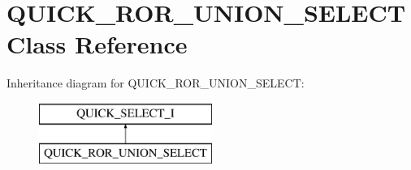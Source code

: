 \hypertarget{classQUICK__ROR__UNION__SELECT}{}\section{Q\+U\+I\+C\+K\+\_\+\+R\+O\+R\+\_\+\+U\+N\+I\+O\+N\+\_\+\+S\+E\+L\+E\+CT Class Reference}
\label{classQUICK__ROR__UNION__SELECT}
Inheritance diagram for Q\+U\+I\+C\+K\+\_\+\+R\+O\+R\+\_\+\+U\+N\+I\+O\+N\+\_\+\+S\+E\+L\+E\+CT\+:\begin{figure}[H]
\begin{center}
\leavevmode
\includegraphics[height=2.000000cm]{classQUICK__ROR__UNION__SELECT}
\end{center}
\end{figure}

